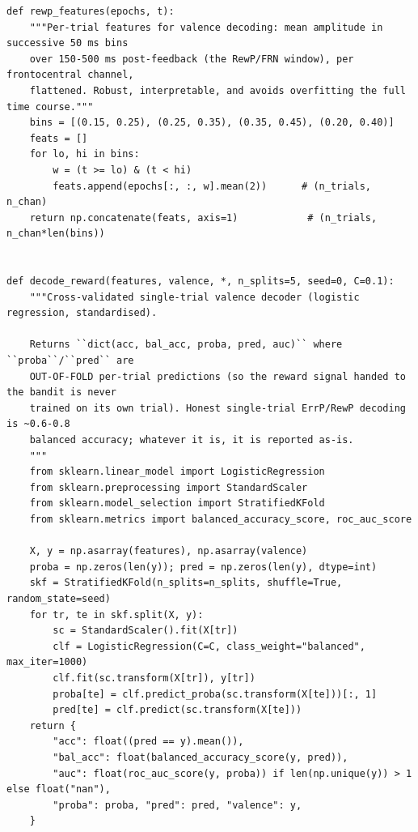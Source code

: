 \begin{lstlisting}[caption={mrl\_trace/biosignal.py},label={lst:siox-src-biosignal}]
def rewp_features(epochs, t):
    """Per-trial features for valence decoding: mean amplitude in successive 50 ms bins
    over 150-500 ms post-feedback (the RewP/FRN window), per frontocentral channel,
    flattened. Robust, interpretable, and avoids overfitting the full time course."""
    bins = [(0.15, 0.25), (0.25, 0.35), (0.35, 0.45), (0.20, 0.40)]
    feats = []
    for lo, hi in bins:
        w = (t >= lo) & (t < hi)
        feats.append(epochs[:, :, w].mean(2))      # (n_trials, n_chan)
    return np.concatenate(feats, axis=1)            # (n_trials, n_chan*len(bins))


def decode_reward(features, valence, *, n_splits=5, seed=0, C=0.1):
    """Cross-validated single-trial valence decoder (logistic regression, standardised).

    Returns ``dict(acc, bal_acc, proba, pred, auc)`` where ``proba``/``pred`` are
    OUT-OF-FOLD per-trial predictions (so the reward signal handed to the bandit is never
    trained on its own trial). Honest single-trial ErrP/RewP decoding is ~0.6-0.8
    balanced accuracy; whatever it is, it is reported as-is.
    """
    from sklearn.linear_model import LogisticRegression
    from sklearn.preprocessing import StandardScaler
    from sklearn.model_selection import StratifiedKFold
    from sklearn.metrics import balanced_accuracy_score, roc_auc_score

    X, y = np.asarray(features), np.asarray(valence)
    proba = np.zeros(len(y)); pred = np.zeros(len(y), dtype=int)
    skf = StratifiedKFold(n_splits=n_splits, shuffle=True, random_state=seed)
    for tr, te in skf.split(X, y):
        sc = StandardScaler().fit(X[tr])
        clf = LogisticRegression(C=C, class_weight="balanced", max_iter=1000)
        clf.fit(sc.transform(X[tr]), y[tr])
        proba[te] = clf.predict_proba(sc.transform(X[te]))[:, 1]
        pred[te] = clf.predict(sc.transform(X[te]))
    return {
        "acc": float((pred == y).mean()),
        "bal_acc": float(balanced_accuracy_score(y, pred)),
        "auc": float(roc_auc_score(y, proba)) if len(np.unique(y)) > 1 else float("nan"),
        "proba": proba, "pred": pred, "valence": y,
    }



\end{lstlisting}
